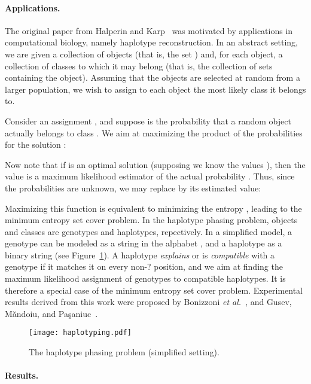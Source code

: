\documentclass[10pt,a4paper]{article}
\begin{document}
\paragraph{Applications.}

The original paper from Halperin and Karp~\cite{HK05} was motivated by applications in computational biology, namely haplotype reconstruction. In an abstract setting, we are given a collection of objects (that is, the set ) and, for each object, a collection of classes to which it may belong (that is, the collection of sets  containing the object). Assuming that the objects are selected at random from a larger population, we wish to assign to each object the most likely class it belongs to.

Consider an assignment , and suppose  is the probability that a random object actually belongs to class . We aim at maximizing the product of the probabilities for the solution :

Now note that if  is an optimal solution (supposing we know the values ), then the value  is a maximum likelihood estimator of the actual probability .
Thus, since the probabilities  are unknown, we may replace  by its estimated value:

Maximizing this function is equivalent to minimizing the entropy , leading to the minimum entropy set cover problem.
In the haplotype phasing problem, objects and classes are genotypes and haplotypes, repectively. In a simplified model, a genotype can be modeled as a string in the alphabet , and a haplotype as a binary string (see Figure~\ref{fig:haplotyping}). A haplotype {\em explains} or is {\em compatible} with a genotype if it matches it on every non-? position, and we aim at finding the maximum likelihood assignment of genotypes to compatible haplotypes. It is therefore a special case of the minimum entropy set cover problem. Experimental results derived from this work were proposed by Bonizzoni {\em et al.}~\cite{BVDM05}, and Gusev, M\u{a}ndoiu, and Pa\c{s}aniuc~\cite{GMIP08}.

\begin{figure}
\begin{center}
\texttt{[image: haplotyping.pdf]}
\end{center}
\caption{\label{fig:haplotyping}The haplotype phasing problem (simplified setting).}
\end{figure}

\paragraph{Results.}
\end{document}
